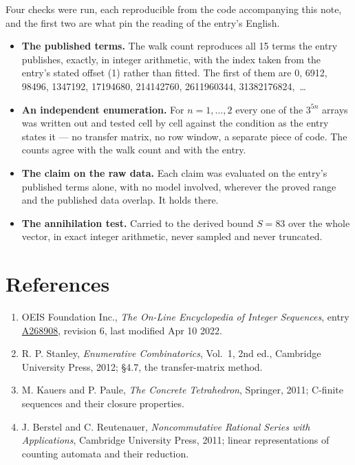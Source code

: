 \documentclass[11pt]{article}
\theoremstyle{definition}
\begin{document}
Four checks were run, each reproducible from the code accompanying this note, and the first two are what pin the reading of the entry's English.

\begin{itemize}

\item {\bfseries The published terms.} The walk count reproduces all 15 terms the entry publishes, exactly, in integer arithmetic, with the index taken from the entry's stated offset (1) rather than fitted. The first of them are 0, 6912, 98496, 1347192, 17194680, 214142760, 2611960344, 31382176824,~\dots

\item {\bfseries An independent enumeration.} For $n = 1,\dots,2$ every one of the $3^{5n}$ arrays was written out and tested cell by cell against the condition as the entry states it --- no transfer matrix, no row window, a separate piece of code. The counts agree with the walk count and with the entry.

\item {\bfseries The claim on the raw data.} Each claim was evaluated on the entry's published terms alone, with no model involved, wherever the proved range and the published data overlap. It holds there.

\item {\bfseries The annihilation test.} Carried to the derived bound $S = 83$ over the whole vector, in exact integer arithmetic, never sampled and never truncated.

\end{itemize}

\section{References}

\begin{enumerate}

\item OEIS Foundation Inc., \emph{The On-Line Encyclopedia of Integer Sequences}, entry \href{https://oeis.org/A268908}{A268908}, revision 6, last modified Apr 10 2022.

\item R. P. Stanley, \emph{Enumerative Combinatorics}, Vol.~1, 2nd ed., Cambridge University Press, 2012; \S4.7, the transfer-matrix method.

\item M. Kauers and P. Paule, \emph{The Concrete Tetrahedron}, Springer, 2011; C-finite sequences and their closure properties.

\item J. Berstel and C. Reutenauer, \emph{Noncommutative Rational Series with Applications}, Cambridge University Press, 2011; linear representations of counting automata and their reduction.

\end{enumerate}
\end{document}
